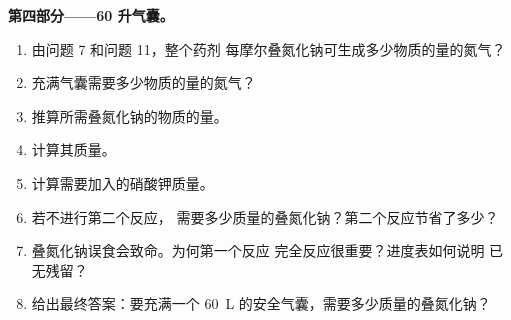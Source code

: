 \begin{problem}
\medskip
\noindent\textbf{第四部分——60 升气囊。}
\begin{enumerate}[resume]
  \item 由问题 7 和问题 11，整个药剂
        每摩尔叠氮化钠可生成多少物质的量的氮气？
  \item 充满气囊需要多少物质的量的氮气？
  \item 推算所需叠氮化钠的物质的量。
  \item 计算其质量。
  \item 计算需要加入的硝酸钾质量。
  \item 若不进行第二个反应，
        需要多少质量的叠氮化钠？第二个反应节省了多少？
  \item 叠氮化钠误食会致命。为何第一个反应
        完全反应很重要？进度表如何说明
        已无残留？
  \item 给出最终答案：要充满一个
        \qty{60}{L} 的安全气囊，需要多少质量的叠氮化钠？
\end{enumerate}
\end{problem}
